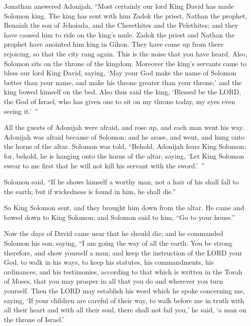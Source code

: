 \myverse{}Jonathan answered Adonijah, “Most certainly our lord King David
has made Solomon king.
\myverse{}The king has sent with him Zadok the priest, Nathan the prophet, Benaiah the
son of Jehoiada, and the Cherethites and the Pelethites; and they have caused him to ride on the king’s
mule.
\myverse{}Zadok the priest and Nathan the prophet have anointed him king in Gihon. They
have come up from there rejoicing, so that the city rang again. This is the noise that you have heard.
\myverse{}Also, Solomon sits on the throne of the kingdom.
\myverse{}Moreover the king’s servants came to bless our lord King David, saying, ‘May
your God make the name of Solomon better than your name, and make his throne greater than your throne;’
and the king bowed himself on the bed.
\myverse{}Also thus said the king, ‘Blessed be the LORD, the God of Israel, who has
given one to sit on my throne today, my eyes even seeing it.’ ”

\myverse{}All the guests of Adonijah were afraid, and rose up, and each
man went his way.
\myverse{}Adonijah was afraid because of Solomon; and he arose, and went, and hung onto
the horns of the altar.
\myverse{}Solomon was told, “Behold, Adonijah fears King Solomon; for, behold, he is
hanging onto the horns of the altar, saying, ‘Let King Solomon swear to me first that he will not kill
his servant with the sword.’ ”

\myverse{}Solomon said, “If he shows himself a worthy man, not a hair of
his shall fall to the earth; but if wickedness is found in him, he shall die.”

\myverse{}So King Solomon sent, and they brought him down from the altar.
He came and bowed down to King Solomon; and Solomon said to him, “Go to your house.”


\mychapter{} \myverse*{}Now the days of David came near that he should die; and he commanded
Solomon his son, saying,
\myverse{}“I am going the way of all the earth. You be strong therefore, and show yourself
a man;
\myverse{}and keep the instruction of the LORD your God, to walk in his ways, to keep
his statutes, his commandments, his ordinances, and his testimonies, according to that which is written in the Torah
of Moses, that you may prosper in all that you do and wherever you turn yourself.
\myverse{}Then the LORD may establish his word which he spoke concerning me, saying, ‘If
your children are careful of their way, to walk before me in truth with all their heart and with all their
soul, there shall not fail you,’ he said, ‘a man on the throne of Israel.’

